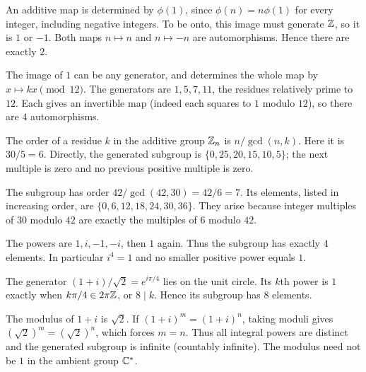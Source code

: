 
An additive map is determined by $\phi(1)$, since $\phi(n)=n\phi(1)$ for every integer, including negative integers. To be onto, this image must generate $\mathbb{Z}$, so it is $1$ or $-1$. Both maps $n\mapsto n$ and $n\mapsto-n$ are automorphisms. Hence there are exactly $2$.


The image of $1$ can be any generator, and determines the whole map by $x\mapsto kx\pmod{12}$. The generators are $1,5,7,11$, the residues relatively prime to $12$. Each gives an invertible map (indeed each squares to $1$ modulo $12$), so there are $4$ automorphisms.


The order of a residue $k$ in the additive group $\mathbb{Z}_n$ is $n/\gcd(n,k)$. Here it is $30/5=6$. Directly, the generated subgroup is $\{0,25,20,15,10,5\}$; the next multiple is zero and no previous positive multiple is zero.


The subgroup has order $42/\gcd(42,30)=42/6=7$. Its elements, listed in increasing order, are $\{0,6,12,18,24,30,36\}$. They arise because integer multiples of $30$ modulo $42$ are exactly the multiples of $6$ modulo $42$.


The powers are $1,i,-1,-i$, then $1$ again. Thus the subgroup has exactly $4$ elements. In particular $i^4=1$ and no smaller positive power equals $1$.


The generator $(1+i)/\sqrt2=e^{i\pi/4}$ lies on the unit circle. Its $k$th power is $1$ exactly when $k\pi/4\in2\pi\mathbb{Z}$, or $8\mid k$. Hence its subgroup has $8$ elements.


The modulus of $1+i$ is $\sqrt2$. If $(1+i)^m=(1+i)^n$, taking moduli gives $(\sqrt2)^m=(\sqrt2)^n$, which forces $m=n$. Thus all integral powers are distinct and the generated subgroup is infinite (countably infinite). The modulus need not be $1$ in the ambient group $\mathbb{C}^*$.

